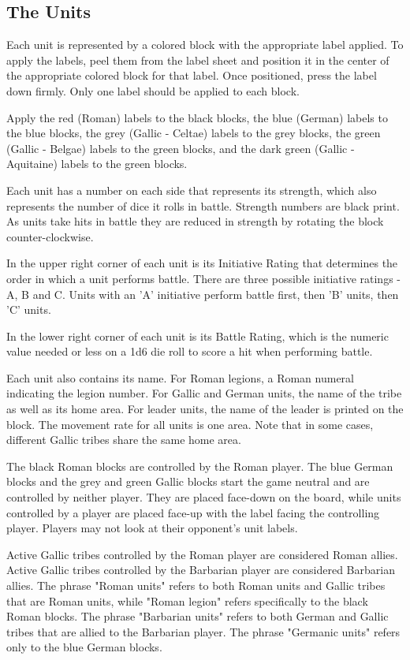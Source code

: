 \par
\subsection{The Units}
Each unit is represented by a colored block with the appropriate label applied. To apply the labels, peel them from the label sheet and position it in the center of the appropriate colored block for that label. Once positioned, press the label down firmly. Only one label should be applied to each block.

Apply the red (Roman) labels to the black blocks, the blue (German) labels to the blue blocks, the grey (Gallic - Celtae) labels to the grey blocks, the green (Gallic - Belgae) labels to the green blocks, and the dark green (Gallic - Aquitaine) labels to the green blocks.

Each unit has a number on each side that represents its strength, which also represents the number of dice it rolls in battle. Strength numbers are black print. As units take hits in battle they are reduced in strength by rotating the block counter-clockwise.

In the upper right corner of each unit is its Initiative Rating that determines the order in which a unit performs battle. There are three possible initiative ratings - A, B and C. Units with an 'A' initiative perform battle first, then 'B' units, then 'C' units.

In the lower right corner of each unit is its Battle Rating, which is the numeric value needed or less on a 1d6 die roll to score a hit when performing battle.

Each unit also contains its name. For Roman legions, a Roman numeral indicating the legion number. For Gallic and German units, the name of the tribe as well as its home area. For leader units, the name of the leader is printed on the block. The movement rate for all units is one area. Note that in some cases, different Gallic tribes share the same home area.

The black Roman blocks are controlled by the Roman player. The blue German blocks and the grey and green Gallic blocks start the game neutral and are controlled by neither player. They are placed face-down on the board, while units controlled by a player are placed face-up with the label facing the controlling player. Players may not look at their opponent's unit labels.

Active Gallic tribes controlled by the Roman player are considered Roman allies. Active Gallic tribes controlled by the Barbarian player are considered Barbarian allies. The phrase "Roman units" refers to both Roman units and Gallic tribes that are Roman units, while "Roman legion" refers specifically to the black Roman blocks. The phrase "Barbarian units" refers to both German and Gallic tribes that are allied to the Barbarian player. The phrase "Germanic units" refers only to the blue German blocks.

